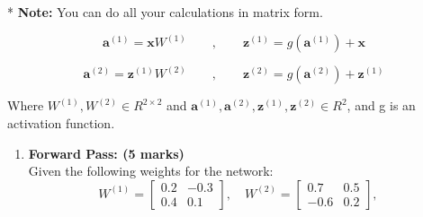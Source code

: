 \documentclass[12pt]{article}
\begin{document}
* \textbf{Note:} You can do all your calculations in matrix form.

\begin{equation}
	\textbf{a}^{(1)} = \textbf{x} W^{(1)}\qquad,\qquad \textbf{z}^{(1)} = g(\textbf{a}^{(1)}) + \textbf{x}
\end{equation}

\begin{equation}
	\textbf{a}^{(2)} = \textbf{z}^{(1)} W^{(2)}\qquad,\qquad \textbf{z}^{(2)} = g(\textbf{a}^{(2)}) + \textbf{z}^{(1)}
\end{equation}

Where $W^{(1)}, W^{(2)} \in R^{2\times 2}$ and $\textbf{a}^{(1)}, \textbf{a}^{(2)}, \textbf{z}^{(1)}, \textbf{z}^{(2)} \in R^2$, and g is an activation function.

\begin{enumerate}[font=\Large]
	\item \textbf{Forward Pass: (5 marks)}\\
	      Given the following weights for the network:
	      $$
		      W^{(1)} = \begin{bmatrix}
			      0.2 & -0.3 \\
			      0.4 & 0.1
		      \end{bmatrix}, \quad
		      W^{(2)} = \begin{bmatrix}
			      0.7  & 0.5 \\
			      -0.6 & 0.2
		      \end{bmatrix}, \quad
	      $$


\end{enumerate}
\end{document}
